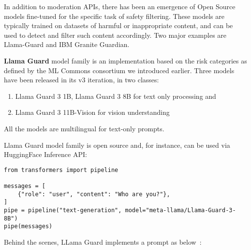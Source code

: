 In addition to moderation APIs, there has been an emergence of Open Source models fine-tuned for the specific task of safety filtering. These models are typically trained on datasets of harmful or inappropriate content, and can be used to detect and filter such content accordingly. Two major examples are Llama-Guard and IBM Granite Guardian.

\textbf{Llama Guard} model family  is an implementation based on the risk categories as defined by the ML Commons consortium we introduced earlier. Three models have been released in its v3 iteration, in two classes:
\begin{enumerate}
    \item Llama Guard 3 1B, Llama Guard 3 8B for text only processing and
    \item Llama Guard 3 11B-Vision for vision understanding
\end{enumerate}

All the models are multilingual for text-only prompts.

Llama Guard model family is open source and, for instance, can be used via HuggingFace Inference API:

\begin{verbatim}
from transformers import pipeline

messages = [
    {"role": "user", "content": "Who are you?"},
]
pipe = pipeline("text-generation", model="meta-llama/Llama-Guard-3-8B")
pipe(messages)
\end{verbatim}

Behind the scenes, LLama Guard implements a prompt as below~:

